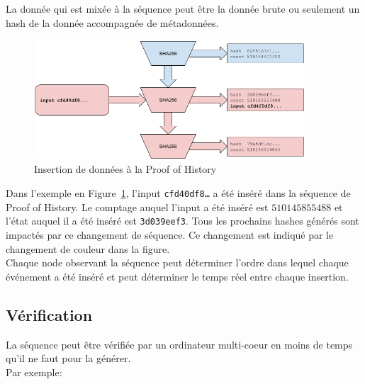 \documentclass[12pt]{article}
\begin{document}
La donnée qui est mixée à la séquence peut être la donnée brute ou seulement un hash de la donnée accompagnée de métadonnées.\\

\begin{figure}[h]
  \begin{center}
    \centering
    \includegraphics[width=0.9\textwidth]{figures/fig_3.png}
    \caption[Fig 3]{Insertion de données à la Proof of History\label{fig:poh_insert}}
  \end{center}
  \end{figure}

  Dans l’exemple en  Figure~\ref{fig:poh_insert}, l'input \texttt{cfd40df8\ldots} a été inséré dans la séquence de Proof of History. Le comptage auquel l’input a été inséré est $510145855488$ et l’état auquel il a été inséré est \texttt{3d039eef3}. Tous les prochains hashes générés sont impactés par ce changement de séquence. Ce changement est indiqué par le changement de couleur dans la figure.\\

Chaque node observant la séquence peut déterminer l’ordre dans lequel chaque événement a été inséré et peut déterminer le temps réel entre chaque insertion.

\subsection{Vérification}\label{poh:verify}
La séquence peut être vérifiée par un ordinateur multi-coeur en moins de temps qu’il ne faut pour la générer.\\

\noindent Par exemple: \\\noindent
\end{document}
